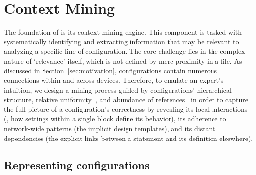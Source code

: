 \section{Context Mining}
\label{mining_method}

The foundation of \sysname{} is its context mining engine. This component is tasked with systematically identifying and extracting information that may be relevant to analyzing a specific line of configuration. The core challenge lies in the complex nature of `relevance' itself, which is not defined by mere proximity in a file. As discussed in Section~\ref{sec:motivation}, configurations contain numerous connections within and across devices. 
Therefore, to emulate an expert's intuition, we design a mining process guided by configurations' hierarchical structure, relative uniformity~\cite{le2006minerals, kakarla2020finding}, and abundance of references~\cite{benson2009complexitymetrics} in order to capture the full picture of a configuration's correctness by revealing its local interactions (\ie, how settings within a single block define its behavior), its adherence to network-wide patterns (the implicit design templates), and its distant dependencies (the explicit links between a statement and its definition elsewhere).


\subsection{Representing configurations}
\label{sec:mining_method:structure}


